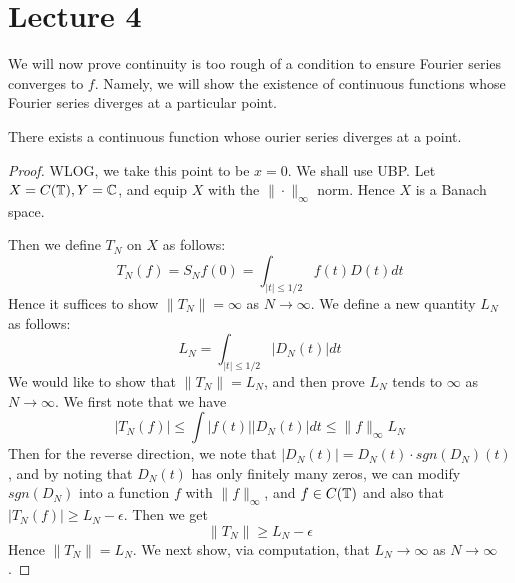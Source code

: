 \section{Lecture 4}
We will now prove continuity is too rough of a condition to ensure Fourier series converges to $f$. Namely, we will show the existence of continuous functions whose Fourier series diverges at a particular point. 

\begin{theorem}
    There exists a continuous function whose ourier series diverges at a point.
\end{theorem}
\begin{proof}
    WLOG, we take this point to be $x=0$. We shall use UBP. Let $X=C(\mathbb{T}), Y=\mathbb{C}$, and equip $X$ with the $\|\cdot\|_\infty$ norm. Hence $X$ is a Banach space. 

    Then we define $T_N$ on $X$ as follows:
    \begin{equation*}
        T_N(f)=S_Nf(0)=\int_{|t|\leq 1/2}f(t)D(t)dt 
    \end{equation*}
    Hence it suffices to show $\|T_N\|=\infty$ as $N\to\infty$. We define a new quantity $L_N$ as follows:
    \begin{equation*}
        L_N=\int_{|t|\leq1/2}|D_N(t)|dt
    \end{equation*}
    We would like to show that $\|T_N\|=L_N$, and then prove $L_N$ tends to $\infty$ as $N\to\infty$.
    We first note that we have
    \begin{equation*}
        |T_N(f)|\leq\int |f(t)||D_N(t)|dt\leq\|f\|_\infty L_N
    \end{equation*}
    Then for the reverse direction, we note that $|D_N(t)|=D_N(t)\cdot sgn(D_N)(t)$, and by noting that $D_N(t)$ has only finitely many zeros, we can modify $sgn(D_N)$ into a function $f$ with $\|f\|_\infty$, and $f\in C(\mathbb{T})$ and also that $|T_N(f)|\geq L_N-\epsilon$. Then we get
    \begin{equation*}
        \|T_N\|\geq L_N-\epsilon
    \end{equation*}
    Hence $\|T_N\|=L_N$. We next show, via computation, that $L_N\to\infty$ as $N\to\infty$.


\end{proof}
